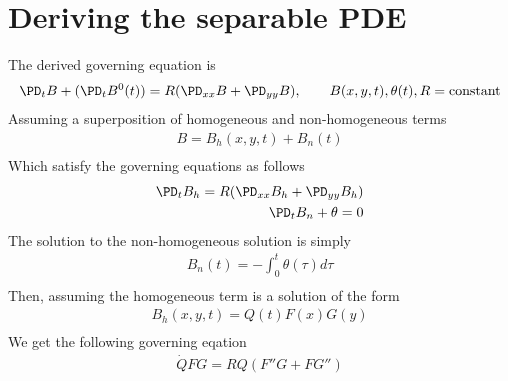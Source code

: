 \documentclass[11pt]{article}
\begin{document}
\MOONSTITLE
\maketitle
\section{Deriving the separable PDE}
The derived governing equation is
\begin{equation}\begin{aligned}
\PD_t B + (\PD_t B^0(t)) = R (\PD_{xx} B + \PD_{yy} B), \qquad B(x,y,t),\theta(t),R=\text{constant} \\
\end{aligned} \end{equation}
Assuming a superposition of homogeneous and non-homogeneous terms
\begin{equation}\begin{aligned}
B = B_h(x,y,t) + B_n(t) \\
\end{aligned} \end{equation}
Which satisfy the governing equations as follows
\begin{equation}\begin{aligned}
\PD_t B_h = R (\PD_{xx} B_h + \PD_{yy} B_h) \\
\PD_t B_n + \theta = 0 \\
\end{aligned} \end{equation}
The solution to the non-homogeneous solution is simply
\begin{equation}\begin{aligned}
B_n(t) = - \int_0^t \theta(\tau) d\tau \\
\end{aligned} \end{equation}
Then, assuming the homogeneous term is a solution of the form
\begin{equation}\begin{aligned}
B_h(x,y,t) = Q(t) F(x) G(y) \\
\end{aligned} \end{equation}
We get the following governing eqation
\begin{equation}\begin{aligned}
\dot{Q} FG = R Q( F'' G +  F G'') \\
\end{aligned} \end{equation}
\end{document}
